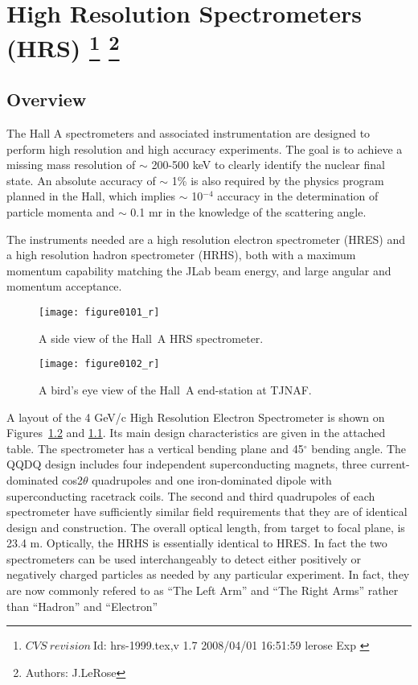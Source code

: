 \chapter[High Resolution Spectrometers (HRS)]{High Resolution Spectrometers (HRS)
\footnote{
  $CVS~revision~ $Id: hrs-1999.tex,v 1.7 2008/04/01 16:51:59 lerose Exp $ $ 
}
\footnote{Authors: J.LeRose }
}
\label{chap:hrs}
\section{Overview}
   
The Hall A spectrometers and associated instrumentation are designed to 
perform high resolution and high accuracy experiments.  The goal is to 
achieve a missing mass resolution of $\sim$ 200-500 keV to clearly 
identify the nuclear final state.  An absolute accuracy of $\sim$ 1\% is 
also required by the physics program planned in the Hall, which implies 
$\sim$ 10$^{-4}$ accuracy in the determination of particle momenta and 
$\sim$ 0.1 mr in the knowledge of the scattering angle.

The instruments needed are a high resolution electron spectrometer 
(HRES) and a high resolution hadron spectrometer (HRHS), both with a 
maximum momentum capability matching the JLab beam energy, and large 
angular and momentum acceptance.

\begin{figure}[tbp]
\begin{center}
\texttt{[image: figure0101\_r]}
\caption[Spectrometers: Elevation View of Hall~A HRS]{A side view of the Hall~A
HRS spectrometer.}  
\label{fig:hrs_ev}
\end{center}
\end{figure}
 
\begin{figure}[tbp]
\begin{center}
\texttt{[image: figure0102\_r]}
\caption[Spectrometers: Plan View of Hall~A]{A bird's eye view of the Hall~A
end-station at TJNAF.}  
\label{fig:hrs_pv}
\end{center}
\end{figure}


A layout of the 4 GeV/c High Resolution Electron Spectrometer is shown 
on Figures~\ref{fig:hrs_pv} and \ref{fig:hrs_ev}.
Its main design characteristics are 
given in the attached table.  The spectrometer has a vertical bending 
plane and 45$^{\circ}$ bending angle.  The QQDQ design includes four 
independent superconducting magnets, three current-dominated 
cos2$\theta $ quadrupoles and one iron-dominated dipole with 
superconducting racetrack coils.  The second and third quadrupoles of 
each spectrometer have sufficiently similar field requirements that they 
are of identical design and construction.  The overall optical length, 
from target to focal plane, is 23.4 m.  Optically, the HRHS 
is essentially identical to HRES. In fact the two spectrometers can be used 
interchangeably to detect either positively or negatively charged particles 
as needed by any particular experiment. In fact, they are now commonly refered to 
as ``The Left Arm'' and ``The Right Arms'' rather than ``Hadron'' and ``Electron'' 

